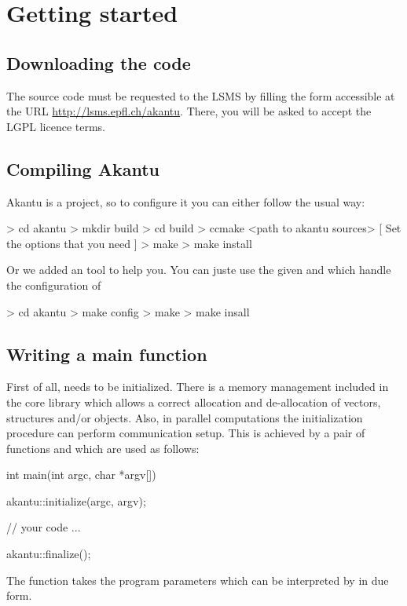 \chapter{Getting started}
\section{Downloading the code}

The \akantu source code must be requested to the LSMS by
filling the form accessible at the URL \url{http://lsms.epfl.ch/akantu}.
There, you will be asked to accept the LGPL licence terms.

\section{Compiling Akantu}

Akantu is a  project, so to configure it you can either follow the usual way:
\begin{command}
  > cd akantu
  > mkdir build
  > cd build
  > ccmake <path to akantu sources>
  [ Set the options that you need ]
  > make
  > make install
\end{command}

Or we added an tool to help you. You can juste use the  given and which handle the configuration of 

\begin{command}
  > cd akantu
  > make config
  > make
  > make insall
\end{command}

\section{Writing a main function\label{sect:common:main}}

First of all, \akantu needs to be initialized.
There is a memory management included in the core library
which allows a correct allocation and de-allocation of
vectors, structures and/or objects. Also, in parallel computations
the initialization procedure can perform communication
setup. This is achieved by a pair of functions 
and  which are used as follows:
\begin{cpp}
int main(int argc, char *argv[])
{
  akantu::initialize(argc, argv);

  // your code
  ...

  akantu::finalize();
}
\end{cpp}
The  function takes the program parameters which
can be interpreted by \akantu in due form.

